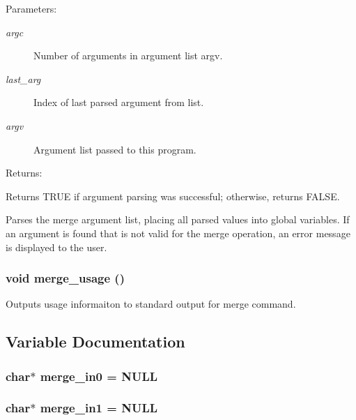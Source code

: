\begin{Desc}
\item[Parameters: ]\par
\begin{description}
\item[{\em 
argc}]Number of arguments in argument list argv. \item[{\em 
last\_\-arg}]Index of last parsed argument from list. \item[{\em 
argv}]Argument list passed to this program.\end{description}
\end{Desc}
\begin{Desc}
\item[Returns: ]\par
Returns TRUE if argument parsing was successful; otherwise, returns FALSE.\end{Desc}
Parses the merge argument list, placing all parsed values into global variables. If an argument is found that is not valid for the merge operation, an error message is displayed to the user. 
\subsubsection{\setlength{\rightskip}{0pt plus 5cm}void merge\_\-usage ()}\label{merge_8c_a4}


Outputs usage informaiton to standard output for merge command. 

\subsection{Variable Documentation}
\subsubsection{\setlength{\rightskip}{0pt plus 5cm}char$\ast$ merge\_\-in0 = NULL}\label{merge_8c_a1}


\subsubsection{\setlength{\rightskip}{0pt plus 5cm}char$\ast$ merge\_\-in1 = NULL}\label{merge_8c_a2}


